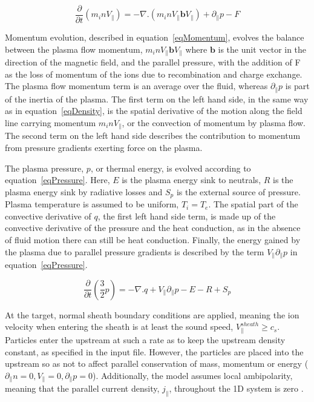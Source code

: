\documentclass[12pt]{article}  %
\begin{document}
  \begin{equation}\label{eqMomentum}
  \frac{\partial}{\partial t}(m_i n V_{\parallel}) = -\nabla . (m_i n V_{\parallel} \textbf{b} V_{\parallel}) + \partial_{\parallel}p - F
  \end{equation}

Momentum evolution, described in equation~\ref{eqMomentum}, evolves the balance between the plasma flow momentum, $m_inV_{\parallel}\textbf{b}V_{\parallel}$ where $\textbf{b}$ is the unit vector in the direction of the magnetic field, and the parallel pressure, with the addition of F as the loss of momentum of the ions due to recombination and charge exchange. The plasma flow momentum term is an average over the fluid, whereas $\partial_{\parallel}p$ is part of the inertia of the plasma. The first term on the left hand side, in the same way as in equation~\ref{eqDensity}, is the spatial derivative of the motion along the field line carrying momentum $m_i n V_{\parallel}$, or the convection of momentum by plasma flow. The second term on the left hand side describes the contribution to momentum from pressure gradients exerting force on the plasma.

The plasma pressure, $ p $, or thermal energy, is evolved according to equation~\ref{eqPressure}. Here, $ E $ is the plasma energy sink to neutrals, $ R $ is the plasma energy sink by radiative losses and $ S_p $ is the external source of pressure. Plasma temperature is assumed to be uniform, $ T_i = T_e $. The spatial part of the convective derivative of $q$, the first left hand side term, is made up of the convective derivative of the pressure and the heat conduction, as in the absence of fluid motion there can still be heat conduction. Finally, the energy gained by the plasma due to parallel pressure gradients is described by the term $V_{\parallel} \partial_{\parallel}p$ in equation~\ref{eqPressure}.

  \begin{equation}\label{eqPressure}
  \frac{\partial}{\partial t}\left( \frac{3}{2}p\right)  = -\nabla.q + V_{\parallel} \partial_{\parallel}p -E - R + S_p
  \end{equation}


At the target, normal sheath boundary conditions are applied, meaning the ion velocity when entering the sheath is at least the sound speed, $ V_{\parallel}^{sheath} \geq c_s$. Particles enter the upstream at such a rate as to keep the upstream density constant, as specified in the input file. However, the particles are placed into the upstream so as not to affect parallel conservation of mass, momentum or energy ($ \partial_{\parallel}n =0, V_{\parallel} =0, \partial_{\parallel}p =0 $). Additionally, the model assumes local ambipolarity, meaning that the parallel current density, $j_{\parallel}$, throughout the 1D system is zero \cite{Stangeby}. 
\end{document}
